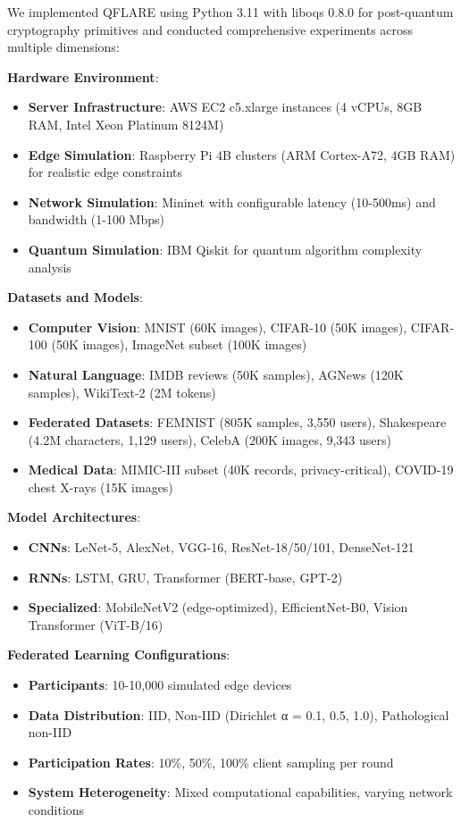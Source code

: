 \documentclass[journal,onecolumn,draftclsnofoot]{IEEEtran}
\begin{document}
We implemented QFLARE using Python 3.11 with liboqs 0.8.0 for post-quantum cryptography primitives and conducted comprehensive experiments across multiple dimensions:

\textbf{Hardware Environment}:
\begin{itemize}
\item \textbf{Server Infrastructure}: AWS EC2 c5.xlarge instances (4 vCPUs, 8GB RAM, Intel Xeon Platinum 8124M)
\item \textbf{Edge Simulation}: Raspberry Pi 4B clusters (ARM Cortex-A72, 4GB RAM) for realistic edge constraints
\item \textbf{Network Simulation}: Mininet with configurable latency (10-500ms) and bandwidth (1-100 Mbps)
\item \textbf{Quantum Simulation}: IBM Qiskit for quantum algorithm complexity analysis
\end{itemize}

\textbf{Datasets and Models}:
\begin{itemize}
\item \textbf{Computer Vision}: MNIST (60K images), CIFAR-10 (50K images), CIFAR-100 (50K images), ImageNet subset (100K images)
\item \textbf{Natural Language}: IMDB reviews (50K samples), AGNews (120K samples), WikiText-2 (2M tokens)
\item \textbf{Federated Datasets}: FEMNIST (805K samples, 3,550 users), Shakespeare (4.2M characters, 1,129 users), CelebA (200K images, 9,343 users)
\item \textbf{Medical Data}: MIMIC-III subset (40K records, privacy-critical), COVID-19 chest X-rays (15K images)
\end{itemize}

\textbf{Model Architectures}:
\begin{itemize}
\item \textbf{CNNs}: LeNet-5, AlexNet, VGG-16, ResNet-18/50/101, DenseNet-121
\item \textbf{RNNs}: LSTM, GRU, Transformer (BERT-base, GPT-2)
\item \textbf{Specialized}: MobileNetV2 (edge-optimized), EfficientNet-B0, Vision Transformer (ViT-B/16)
\end{itemize}

\textbf{Federated Learning Configurations}:
\begin{itemize}
\item \textbf{Participants}: 10-10,000 simulated edge devices
\item \textbf{Data Distribution}: IID, Non-IID (Dirichlet α = 0.1, 0.5, 1.0), Pathological non-IID
\item \textbf{Participation Rates}: 10\%, 50\%, 100\% client sampling per round
\item \textbf{System Heterogeneity}: Mixed computational capabilities, varying network conditions
\end{itemize}
\end{document}
